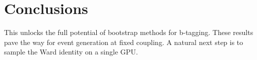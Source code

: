 \section{Conclusions}\label{sec:conclusions}

This unlocks the full potential of bootstrap methods for b-tagging.
These results pave the way for event generation at fixed coupling. A
natural next step is to sample the Ward identity on a single GPU.

